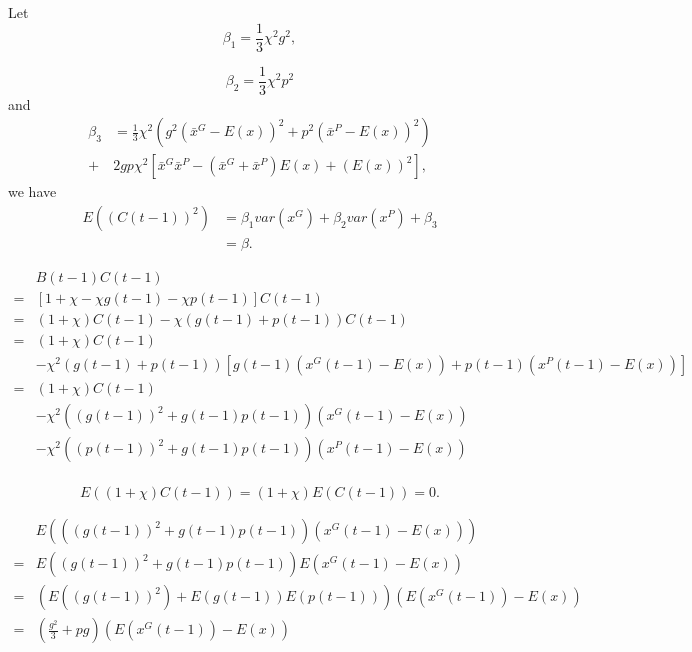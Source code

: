 \documentclass[12pt]{article}
\begin{document}
Let 
\begin{equation}
\label{eq:def_beta_1}
\beta_{1} = \frac{1}{3} \chi^{2} g^{2},
\end{equation}

\begin{equation}
\label{eq:def_beta_2}
\beta_{2} = \frac{1}{3} \chi^{2} p^{2}
\end{equation}
and
\begin{equation}
\label{eq:def_beta_3}
\begin{aligned}
\beta_{3} & = \frac{1}{3} \chi^{2} ( g^{2} (  \bar{x}^{G} - E(x) )^{2}  + p^{2} ( \bar{x}^{P} - E(x) )^{2} ) \\
 + & 2 g p \chi^{2} [ \bar{x}^{G} \bar{x}^{P} - ( \bar{x}^{G} + \bar{x}^{P} ) E(x) + ( E(x) )^{2} ],
 \end{aligned}
\end{equation}
we have
\begin{equation}
\label{eq:c_2_mean:new}
\begin{aligned}
E( ( C(t-1) )^{2} ) & = \beta_{1} var(x^{G}) + \beta_{2} var(x^{P}) + \beta_{3} \\
& = \beta .
\end{aligned}
\end{equation}

\begin{equation}
\label{eq:b_c}
\begin{aligned}
& B(t-1)C(t-1) \\
= & [ 1 + \chi - \chi g(t-1) - \chi p(t-1) ] C(t-1) \\
= & (1 + \chi) C(t-1) - \chi ( g(t-1) + p(t-1) ) C(t-1) \\
= & (1 + \chi) C(t-1) \\
& - \chi^{2} ( g(t-1) + p(t-1) ) [ g(t-1) ( x^{G}(t-1) - E(x) ) + p(t-1) ( x^{P}(t-1) - E(x) ) ] \\
= & (1 + \chi) C(t-1) \\
& - \chi^{2} ( ( g(t-1) )^{2} + g(t-1) p(t-1) ) ( x^{G}(t-1) - E(x) ) \\
& - \chi^{2} ( ( p(t-1) )^{2} + g(t-1) p(t-1) ) ( x^{P}(t-1) - E(x) ) \\
\end{aligned}
\end{equation}

\begin{equation}
\label{eq:b_c_mean:1}
E( (1 + \chi) C(t-1) ) = (1 + \chi) E( C(t-1) ) = 0.
\end{equation}

\begin{equation}
\label{eq:b_c_mean:2}
\begin{aligned}
& E( ( ( g(t-1) )^{2} + g(t-1) p(t-1) ) ( x^{G}(t-1) - E(x) ) ) \\
= & E( ( g(t-1) )^{2} + g(t-1) p(t-1) ) E( x^{G}(t-1) - E(x) ) \\
= & ( E( ( g(t-1) )^{2} ) + E( g(t-1) ) E( p(t-1) ) ) ( E(x^{G}(t-1)) - E(x) ) \\
= & ( \frac{g^{2}}{3} + p g ) ( E(x^{G}(t-1)) - E(x) )
\end{aligned}
\end{equation}
\end{document}
